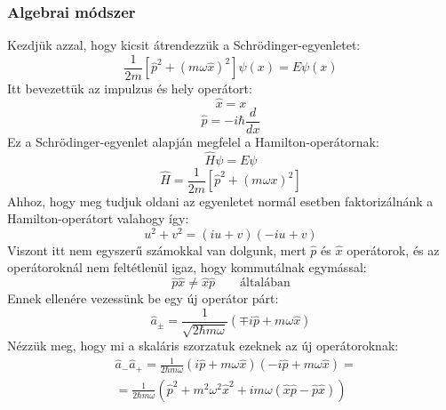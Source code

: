 \documentclass[../main.tex]{subfiles}
\begin{document}
\subsubsection*{Algebrai módszer}
Kezdjük azzal, hogy kicsit átrendezzük a Schrödinger-egyenletet:
\begin{equation}
    \frac{1}{2m} \left[\hat{p}^2 + (m \omega \hat{x})^2\right] \psi(x) = E \psi(x)
\end{equation}
Itt bevezettük az impulzus és hely operátort:
\begin{equation}
    \hat{x} = x
\end{equation}
\begin{equation}
    \hat{p} = - i \hbar \frac{d}{dx}
\end{equation}
Ez a Schrödinger-egyenlet alapján megfelel a Hamilton-operátornak:
\begin{equation}
    \hat{H}\psi = E\psi
\end{equation}
\begin{equation}
    \hat{H} = \frac{1}{2m} \left[\hat{p}^2 + (m \omega x)^2\right]
\end{equation}
Ahhoz, hogy meg tudjuk oldani az egyenletet normál esetben faktorizálnánk a Hamilton-operátort valahogy így:
\begin{equation}
    u^2 + v^2 = (iu + v)(- iu + v)
\end{equation}
Viszont itt nem egyszerű számokkal van dolgunk, mert $\hat{p}$ és $\hat{x}$ operátorok, és az operátoroknál nem feltétlenül igaz, hogy
kommutálnak egymással:
\begin{equation}
    \hat{p} \hat{x} \neq \hat{x} \hat{p} \qquad \text{általában}
\end{equation}
Ennek ellenére vezessünk be egy új operátor párt:
\begin{equation}
    \hat{a}_\pm = \frac{1}{\sqrt{2 \hbar m \omega}} \left( \mp i \hat{p} + m \omega \hat{x} \right)
\end{equation}
Nézzük meg, hogy mi a skaláris szorzatuk ezeknek az új operátoroknak:
\begin{equation}
    \begin{aligned}
    & \hat{a}_- \hat{a}_+ = \frac{1}{2 \hbar m \omega} \left( i \hat{p} + m \omega \hat{x} \right) \left( - i \hat{p} + m \omega \hat{x} \right) = \\
    & = \frac{1}{2 \hbar m \omega} \left( \hat{p}^2 + m^2 \omega^2 \hat{x}^2 + i m \omega (\hat{x} \hat{p} - \hat{p} \hat{x}) \right)
    \end{aligned}
\end{equation}
\end{document}
